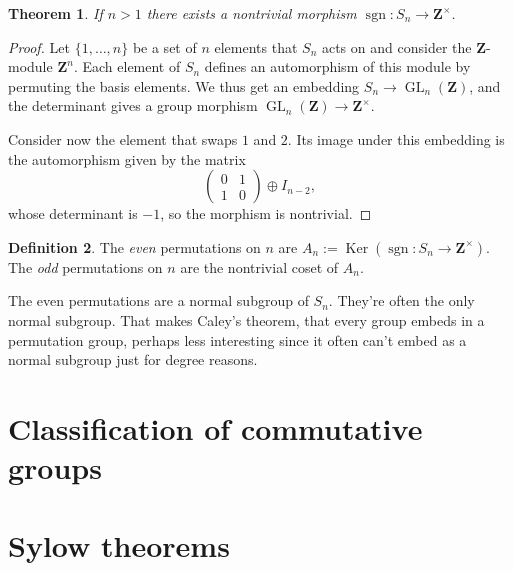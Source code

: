 \documentclass[11pt]{article}
\newtheorem{theo}{Theorem}
\theoremstyle{definition}
\newtheorem{defi}[theo]{Definition}
\def\ZZ{\mathbf{Z}}
\DeclareMathOperator{\ke}{Ker}
\DeclareMathOperator{\sgn}{sgn}
\DeclareMathOperator{\GL}{GL}
\begin{document}
\begin{theo}
If $n > 1$ there exists a nontrivial morphism $\sgn : S_n \to \ZZ^\times$.
\end{theo}

\begin{proof}
Let $\{1, \ldots, n\}$ be a set of $n$ elements that $S_n$ acts on
and consider the $\ZZ$-module $\ZZ^{n}$.
Each element of $S_n$ defines an automorphism of this module by permuting the
basis elements.
We thus get an embedding $S_n \to \GL_n(\ZZ)$, and the determinant gives a
group morphism $\GL_n(\ZZ) \to \ZZ^\times$.

Consider now the element that swaps $1$ and $2$.
Its image under this embedding is the automorphism given by the matrix
$$
\begin{pmatrix}
0 & 1
\\
1 & 0
\end{pmatrix}
\oplus I_{n-2},
$$
whose determinant is $-1$, so the morphism is nontrivial.
\end{proof}


\begin{defi}
The \emph{even} permutations on $n$ are $A_n := \ke(\sgn : S_n \to \ZZ^\times)$.
The \emph{odd} permutations on $n$ are the nontrivial coset of $A_n$.
\end{defi}



The even permutations are a normal subgroup of $S_n$.
They're often the only normal subgroup.
That makes Caley's theorem, that every group embeds in a permutation group,
perhaps less interesting since it often can't embed as a normal subgroup just
for degree reasons.



\section{Classification of commutative groups}

\section{Sylow theorems}
\end{document}
